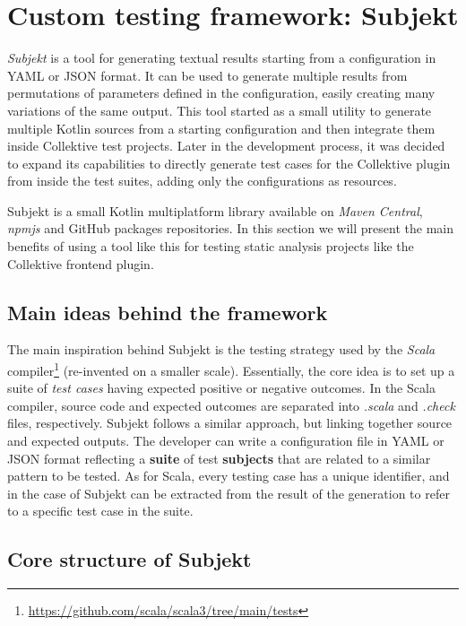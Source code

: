 \documentclass[12pt,a4paper,openright,twoside]{book}
\begin{document}
\section{Custom testing framework: Subjekt}

\emph{Subjekt} is a tool for generating textual results starting from a
configuration in YAML or JSON format. It can be used to generate multiple
results from permutations of parameters defined in the configuration, easily
creating many variations of the same output.
%
This tool started as a small utility to generate multiple Kotlin sources from a
starting configuration and then integrate them inside Collektive test projects.
Later in the development process, it was decided to expand its capabilities to
directly generate test cases for the Collektive plugin from inside the test
suites, adding only the configurations as resources.

Subjekt is a small Kotlin multiplatform library available on \emph{Maven
Central}, \emph{npmjs} and GitHub packages repositories. In this section we will
present the main benefits of using a tool like this for testing static analysis
projects like the Collektive frontend plugin.

\subsection{Main ideas behind the framework}

The main inspiration behind Subjekt is the testing strategy used by the
\emph{Scala}
compiler\footnote{\url{https://github.com/scala/scala3/tree/main/tests}}
(re-invented on a smaller scale).
% 
Essentially, the core idea is to set up a suite of \emph{test cases} having
expected positive or negative outcomes. In the Scala compiler, source code and
expected outcomes are separated into \emph{.scala} and \emph{.check} files,
respectively. 
%
Subjekt follows a similar approach, but linking together source and expected
outputs. The developer can write a configuration file in YAML or JSON format
reflecting a \textbf{suite} of test \textbf{subjects} that are related to 
a similar pattern to be tested. 
%
As for Scala, every testing case has a unique identifier, and in the case of
Subjekt can be extracted from the result of the generation to refer to a 
specific test case in the suite.

\subsection{Core structure of Subjekt}
\end{document}
